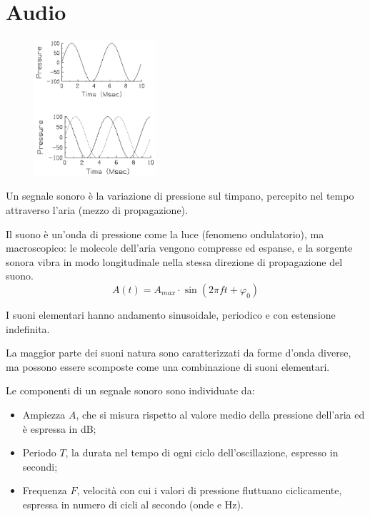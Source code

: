 \section{Audio}

 \begin{figure}
	\vspace{-10pt}
	\includegraphics[width=0.4\textwidth]{Lezioni/Immagini/ondepressione}
	\vspace{-40pt}
\end{figure}

Un segnale sonoro è la variazione di pressione sul timpano, percepito nel tempo attraverso l'aria (mezzo di propagazione). 

Il suono è un'onda di pressione come la luce (fenomeno ondulatorio), ma macroscopico: le molecole dell'aria vengono compresse ed espanse, e la sorgente sonora vibra in modo longitudinale nella stessa direzione di propagazione del suono.
$$A(t) = A_{max} \cdot \sin(2\pi ft + \varphi_0)$$

I suoni elementari hanno andamento sinusoidale, periodico e con estensione indefinita. 

La maggior parte dei suoni natura sono caratterizzati da forme d'onda diverse, ma possono essere scomposte come una combinazione di suoni elementari.

Le componenti di un segnale sonoro sono individuate da:
\begin{itemize}
	\item Ampiezza $A$, che si misura rispetto al valore medio della pressione dell'aria ed è espressa in dB;
	\item Periodo $T$, la durata nel tempo di ogni ciclo dell'oscillazione, espresso in secondi;
	\item Frequenza $F$, velocità con cui i valori di pressione fluttuano ciclicamente, espressa in numero di cicli al secondo (onde e Hz).
\end{itemize}

